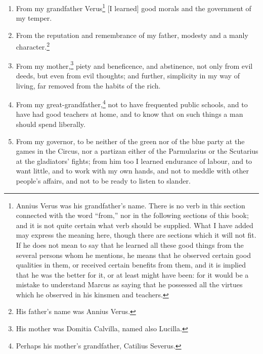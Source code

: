 \begin{enumerate}
\item From my grandfather Verus\footnote{Annius Verus was his grandfather's name. There is no verb in this section connected with the word ``from,'' nor in the following sections of this book; and it is not quite certain what verb should be supplied. What I have added may express the meaning here, though there are sections which it will not fit. If he does not mean to say that he learned all these good things from the several persons whom he mentions, he means that he observed certain good qualities in them, or received certain benefits from them, and it is implied that he was the better for it, or at least might have been: for it would be a mistake to understand Marcus as saying that he possessed all the virtues which he observed in his kinsmen and teachers.} [{\clarify I learned}] good morals and the government of my temper. 

\item From the reputation and remembrance of my father, modesty and a manly character.\footnote{His father's name was Annius Verus.}

\item From my mother,\footnote{His mother was Domitia Calvilla, named also Lucilla.} piety and beneficence, and abstinence, not only from evil deeds, but even from evil thoughts; and further, simplicity in my way of living, far removed from the habits of the rich. 

\item From my great-grandfather,\footnote{Perhaps his mother's grandfather, Catilius Severus.} not to have frequented public schools, and to have had good teachers at home, and to know that on such things a man should spend liberally. 

\item From my governor, to be neither of the green nor of the blue party at the games in the Circus, nor a partizan either of the Parmularius or the Scutarius at the gladiators' fights; from him too I learned endurance of labour, and to want little, and to work with my own hands, and not to meddle with other people's affairs, and not to be ready to listen to slander. 


\end{enumerate}
